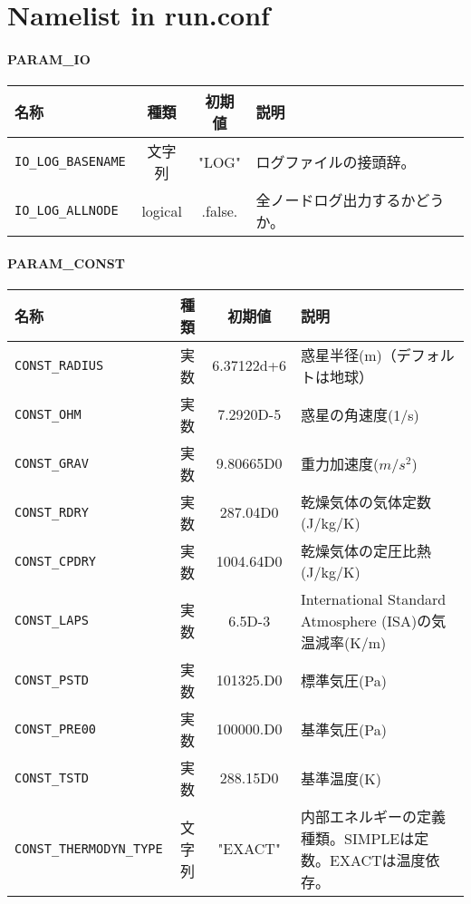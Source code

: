\chapter{Namelist in run.conf} \label{app:namelist}

\subsubsection{PARAM\_IO}
\begin{tabularx}{150mm}{|l|c|c|X|} \hline
 \rowcolor[gray]{0.9} 名称 & 種類 & 初期値 & 説明 \\ \hline
 \verb|IO_LOG_BASENAME| & 文字列 & "LOG" & ログファイルの接頭辞。 \\ \hline
 \verb|IO_LOG_ALLNODE| & logical & .false. & 全ノードログ出力するかどうか。 \\ \hline
\end{tabularx}


\subsubsection{PARAM\_CONST}
\begin{tabularx}{150mm}{|l|c|c|X|} \hline
 \rowcolor[gray]{0.9} 名称 & 種類 & 初期値 & 説明 \\ \hline
 \verb|CONST_RADIUS| & 実数 & 6.37122d+6 & 惑星半径(m)（デフォルトは地球） \\ \hline
 \verb|CONST_OHM| & 実数 & 7.2920D-5 & 惑星の角速度(1/s) \\ \hline
 \verb|CONST_GRAV| & 実数 & 9.80665D0 & 重力加速度($m/s^{2}$) \\ \hline
 \verb|CONST_RDRY| & 実数 & 287.04D0 & 乾燥気体の気体定数 (J/kg/K)\\ \hline
 \verb|CONST_CPDRY| & 実数 & 1004.64D0 & 乾燥気体の定圧比熱 (J/kg/K) \\ \hline
 \verb|CONST_LAPS| & 実数 & 6.5D-3 & International Standard Atmosphere (ISA)の気温減率(K/m) \\ \hline
 \verb|CONST_PSTD| & 実数 & 101325.D0 & 標準気圧(Pa) \\ \hline
 \verb|CONST_PRE00| & 実数 & 100000.D0 & 基準気圧(Pa) \\ \hline
 \verb|CONST_TSTD| & 実数 & 288.15D0 & 基準温度(K) \\ \hline
 \verb|CONST_THERMODYN_TYPE| & 文字列 & "EXACT" & 内部エネルギーの定義種類。SIMPLEは定数。EXACTは温度依存。 \\ \hline
\end{tabularx}

